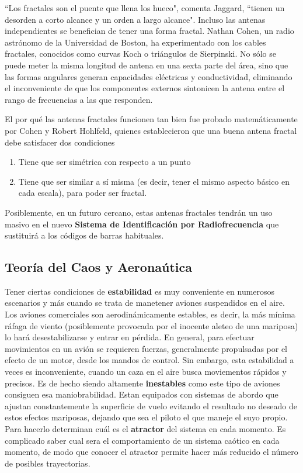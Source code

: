 \begin{example}
``Los fractales son el puente que llena los hueco", comenta Jaggard, ``tienen un desorden a corto alcance y un orden a largo alcance". Incluso las antenas independientes se benefician de tener una forma fractal. Nathan Cohen, un radio astrónomo de la Universidad de Boston, ha experimentado con los cables fractales, conocidos como curvas Koch o triángulos de Sierpinski. No sólo se puede meter la misma longitud de antena en una sexta parte del área, sino que las formas angulares generan capacidades eléctricas y conductividad, eliminando el inconveniente de que los componentes externos sintonicen la antena entre el rango de frecuencias a las que responden.

El por qué las antenas fractales funcionen tan bien fue probado matemáticamente por Cohen y Robert Hohlfeld, quienes establecieron que una buena antena fractal debe satisfacer dos condiciones
\begin{enumerate}
\item Tiene que ser simétrica con respecto a un punto
\item Tiene que ser similar a sí misma (es decir, tener el mismo aspecto básico en cada escala), para poder ser fractal.
\end{enumerate}

Posiblemente, en un futuro cercano, estas antenas fractales tendrán un uso masivo en el nuevo \textbf{Sistema de Identificación por Radiofrecuencia} que sustituirá a los códigos de barras habituales.
\end{example}

\subsection{Teoría del Caos y Aeronaútica}
Tener ciertas condiciones de \textbf{estabilidad} es muy conveniente en numerosos escenarios y más cuando se trata de manetener aviones suspendidos en el aire. Los aviones comerciales son aerodinámicamente estables, es decir, la más mínima ráfaga de viento (posiblemente provocada por el inocente aleteo de una mariposa) lo hará desestabilizarse y entrar en pérdida. En general, para efectuar movimientos en un avión se requieren fuerzas, generalmente propulsadas por el efecto de un motor, desde los mandos de control. Sin embargo, esta estabilidad a veces es inconveniente, cuando un caza en el aire busca moviementos rápidos y precisos. Es de hecho siendo altamente \textbf{inestables} como este tipo de aviones consiguen esa maniobrabilidad. Estan equipados con sistemas de abordo que ajustan constantemente la superficie de vuelo evitando el resultado no deseado de estos efectos mariposas, dejando que sea el piloto el que maneje el suyo propio. Para hacerlo determinan cuál es el \textbf{atractor} del sistema en cada momento. Es complicado saber cual sera el comportamiento de un sistema caótico en cada momento, de modo que conocer el atractor permite hacer más reducido el número de posibles trayectorias.

